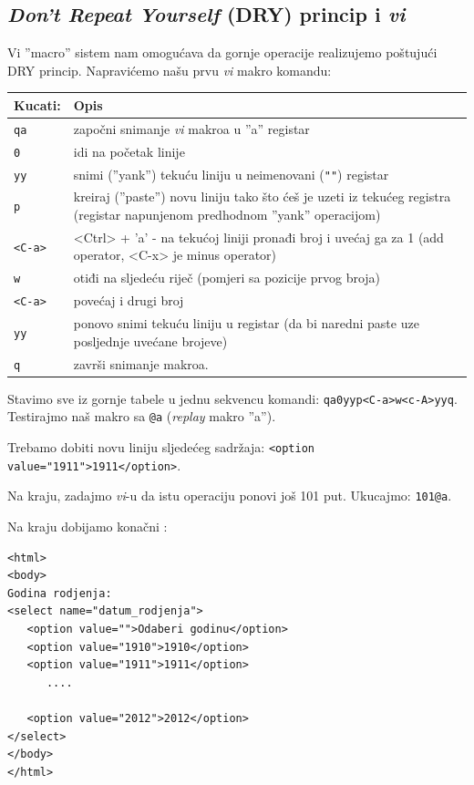 \documentclass[times, utf8, seminar]{fit}
\begin{document}
\subsection{\emph{Don't Repeat Yourself} (DRY) princip i \emph{vi}}
 
Vi ''macro'' sistem nam omogućava da gornje operacije realizujemo poštujući DRY princip. Napravićemo našu prvu \emph{vi} makro komandu:
\begin{center}
\begin{tabular}{ |p{4cm}|p{10cm}| }
  \hline                        
   Kucati:    &  Opis \\ 
   \hline
   \verb+qa+     & započni snimanje \emph{vi} makroa u ''a'' registar \\
   \verb+0+      & idi na početak linije \\
   \verb+yy+     & snimi (''yank'') tekuću liniju u neimenovani (\verb+""+) registar \\
   \verb+p+      & kreiraj (''paste'') novu liniju tako što ćeš je uzeti iz tekućeg registra (registar napunjenom predhodnom ''yank'' operacijom) \\
   \verb+<C-a>+  & <Ctrl> + 'a' - na tekućoj liniji pronađi broj i uvećaj ga za 1 (add operator, <C-x> je minus operator) \\
   \verb+w+      & otiđi na sljedeću riječ (pomjeri sa pozicije prvog broja) \\
   \verb+<C-a>+  & povećaj i drugi broj \\
   \verb+yy+     & ponovo snimi tekuću liniju u registar (da bi naredni paste uze posljednje uvećane brojeve) \\
   \verb+q+      & završi snimanje makroa.\\
   \hline
\end{tabular}
\end{center}

Stavimo sve iz gornje tabele u jednu sekvencu komandi: \verb+qa0yyp<C-a>w<c-A>yyq+. \newline Testirajmo naš makro sa \verb+@a+ (\emph{replay} makro ''a''). 

Trebamo dobiti novu liniju sljedećeg sadržaja: \verb+<option value="1911">1911</option>+. 

Na kraju, zadajmo \emph{vi}-u da istu operaciju ponovi još 101 put. Ukucajmo: \verb+101@a+. 

Na kraju dobijamo konačni \href{https://gist.github.com/4412263}{\color{blue}{rezultat}}:

\begin{lstlisting}
<html>
<body>
Godina rodjenja:
<select name="datum_rodjenja">
   <option value="">Odaberi godinu</option>
   <option value="1910">1910</option>
   <option value="1911">1911</option>
      ....

   <option value="2012">2012</option>
</select>
</body>
</html>
\end{lstlisting}
\end{document}
